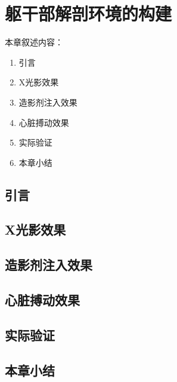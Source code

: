 \chapter{躯干部解剖环境的构建}
\label{chap6}

本章叙述内容：
\begin{enumerate}
  \item 引言
  \item X光影效果
  \item 造影剂注入效果
  \item 心脏搏动效果
  \item 实际验证
  \item 本章小结
\end{enumerate}

\section{引言}

\section{X光影效果}
\label{sec6.2}

\section{造影剂注入效果}

\section{心脏搏动效果}

\section{实际验证}

\section{本章小结}